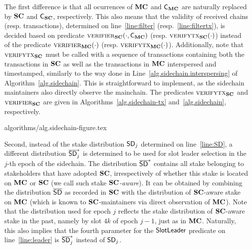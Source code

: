 The first difference is that all ocurrences of $\mathbf{MC}$ and $\mathsf{C_{\mathbf{MC}}}$ are
naturally replaced by $\mathbf{SC}$ and $\mathsf{C_{\mathbf{SC}}}$, respectively.  This also means that
the validity of received chains (resp. transactions), determined on
line~\ref{line:filter} (resp.~\ref{line:filtertx}), is decided based on
predicate
$\textsc{verifier}_{\mathbf{SC}}(\cdot,\mathsf{C_{\mathbf{MC}}})$ (resp.
$\textsc{verifytx}_{\mathbf{SC}}(\cdot)$)
instead of
the predicate
$\textsc{verifier}_{\mathbf{MC}}(\cdot)$ (resp.
$\textsc{verifytx}_{\mathbf{MC}}(\cdot)$). Additionally, note that $\textsc{verifytx}_{\mathbf{SC}}$ must be called
with a sequence of transactions containing both the transactions in $\mathbf{SC}$ as
well as the transactions in $\mathbf{MC}$ interspersed and timestamped, similarly to the
way done in Line~\ref{alg.sidechain.interspersing} of
Algorithm~\ref{alg.sidechain}. This is straightforward to implement, as the
sidechain maintainers also directly observe the mainchain. The predicates
$\textsc{verifytx}_{\mathbf{SC}}$
and
$\textsc{verifier}_{\mathbf{SC}}$
are given in
Algorithms~\ref{alg.sidechain-tx}
and~\ref{alg.sidechain}, respectively.

{algorithms/alg.sidechain-figure.tex}

Second, instead of the
stake distribution $\mathsf{SD}_j$ determined on line~\ref{line:SD}, a different
distribution $\mathsf{\overline{SD}}^*_j$ is determined to be used for slot leader selection in
the $j$-th epoch of the sidechain.  The distribution $\mathsf{\overline{SD}}^*$ contains all
stake belonging to stakeholders that have adopted $\mathbf{SC}$, irrespectively of
whether this stake is located on $\mathbf{MC}$ or $\mathbf{SC}$ (we call such stake
\emph{$\mathbf{SC}$-aware}).  It can be obtained by combining the distribution $\mathsf{\overline{SD}}$ as
recorded in $\mathbf{SC}$ with the distribution of $\mathbf{SC}$-aware stake on $\mathbf{MC}$ (which is
known to $\mathbf{SC}$-maintainers via direct observation of $\mathbf{MC}$).
Note that the
distribution used for epoch $j$ reflects the stake distribution of $\mathbf{SC}$-aware
stake in the past, namely by slot $4k$ of epoch $j-1$, just as in $\mathbf{MC}$.
Naturally, this also implies that the fourth parameter for the $\mathsf{SlotLeader}$ predicate on
line~\ref{line:leader} is  $\mathsf{\overline{SD}}^*_j$ %
instead of $\mathsf{SD}_j$.

